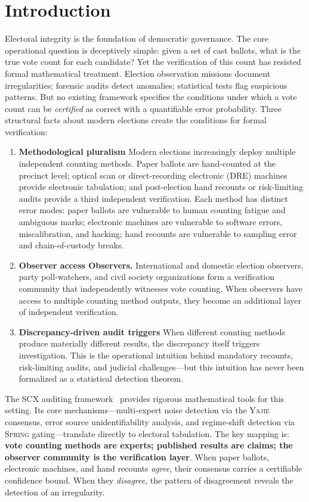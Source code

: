 \documentclass[11pt,a4paper]{article}
\theoremstyle{definition}
\newcommand{\Yajie}{\textsc{Yajie}}
\newcommand{\Spring}{\textsc{Spring}}
\newcommand{\SCX}{\textsc{SCX}}
\begin{document}
\section{Introduction}
Electoral integrity is the foundation of democratic governance. The core operational question is deceptively simple: given a set of cast ballots, what is the true vote count for each candidate? Yet the verification of this count has resisted formal mathematical treatment. Election observation missions document irregularities; forensic audits detect anomalies; statistical tests flag suspicious patterns. But no existing framework specifies the conditions under which a vote count can be \textit{certified} as correct with a quantifiable error probability.
Three structural facts about modern elections create the conditions for formal verification:
\begin{enumerate}[label=(\roman*)]
    \item \textbf{Methodological pluralism} Modern elections increasingly deploy multiple independent counting methods. Paper ballots are hand-counted at the precinct level; optical scan or direct-recording electronic (DRE) machines provide electronic tabulation; and post-election hand recounts or risk-limiting audits provide a third independent verification. Each method has distinct error modes: paper ballots are vulnerable to human counting fatigue and ambiguous marks; electronic machines are vulnerable to software errors, miscalibration, and hacking; hand recounts are vulnerable to sampling error and chain-of-custody breaks.
    \item \textbf{Observer access Observers.} International and domestic election observers, party poll-watchers, and civil society organizations form a verification community that independently witnesses vote counting. When observers have access to multiple counting method outputs, they become an additional layer of independent verification.
    \item \textbf{Discrepancy-driven audit triggers} When different counting methods produce materially different results, the discrepancy itself triggers investigation. This is the operational intuition behind mandatory recounts, risk-limiting audits, and judicial challenges---but this intuition has never been formalized as a statistical detection theorem.
\end{enumerate}
The \SCX{} auditing framework~\cite{SCX2025} provides rigorous mathematical tools for this setting. Its core mechanisms---multi-expert noise detection via the \Yajie{} consensus, error source unidentifiability analysis, and regime-shift detection via \Spring{} gating---translate directly to electoral tabulation. The key mapping is: \textbf{vote counting methods are experts; published results are claims; the observer community is the verification layer}. When paper ballots, electronic machines, and hand recounts \textit{agree}, their consensus carries a certifiable confidence bound. When they \textit{disagree}, the pattern of disagreement reveals the detection of an irregularity.
\end{document}
